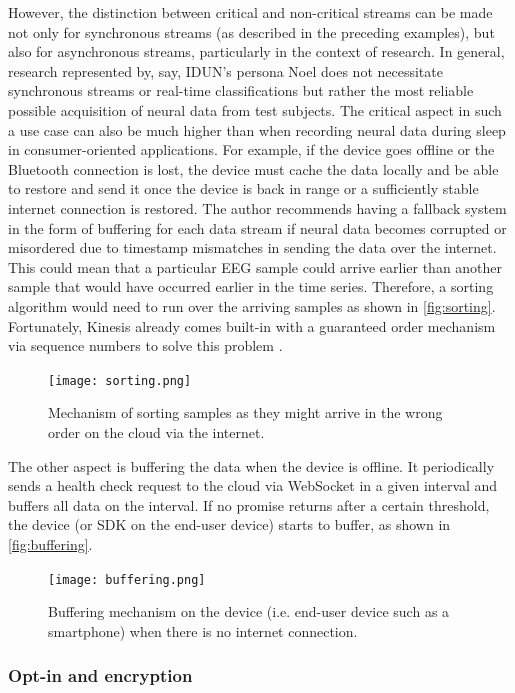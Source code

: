 However, the distinction between critical and non-critical streams can be made not only for synchronous streams (as described in the preceding examples), but also for asynchronous streams, particularly in the context of research. In general, research represented by, say, IDUN’s persona Noel does not necessitate synchronous streams or real-time classifications but rather the most reliable possible acquisition of neural data from test subjects. The critical aspect in such a use case can also be much higher than when recording neural data during sleep in consumer-oriented applications. For example, if the device goes offline or the Bluetooth connection is lost, the device must cache the data locally and be able to restore and send it once the device is back in range or a sufficiently stable internet connection is restored. The author recommends having a fallback system in the form of buffering for each data stream if neural data becomes corrupted or misordered due to timestamp mismatches in sending the data over the internet. This could mean that a particular EEG sample could arrive earlier than another sample that would have occurred earlier in the time series. Therefore, a sorting algorithm would need to run over the arriving samples as shown in \autoref{fig:sorting}. Fortunately, Kinesis already comes built-in with a guaranteed order mechanism via sequence numbers to solve this problem \citep{amazon_web_services_inc_amazon_nodate}.

\begin{figure}[!ht]
  \centering
  \texttt{[image: sorting.png]}
  \caption{Mechanism of sorting samples as they might arrive in the wrong order on the cloud via the internet.}
  \label{fig:sorting}
\end{figure}

The other aspect is buffering the data when the device is offline. It periodically sends a health check request to the cloud via WebSocket in a given interval and buffers all data on the interval. If no promise returns after a certain threshold, the device (or SDK on the end-user device) starts to buffer, as shown in \autoref{fig:buffering}.

\begin{figure}[!ht]
  \centering
  \texttt{[image: buffering.png]}
  \caption{Buffering mechanism on the device (i.e. end-user device such as a smartphone) when there is no internet connection.}
  \label{fig:buffering}
\end{figure}

\subsubsection{Opt-in and encryption}
\label{chapter5-opt-in-and-encryption}

